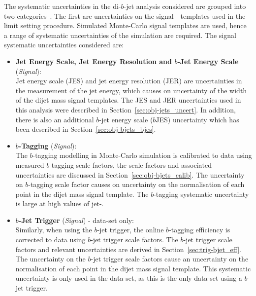 The systematic uncertainties in the di-$b$-jet analysis considered are grouped into two categories~\cite{dibjet-ichep_conf}.
The first are
uncertainties on the signal~\mjj~templates used in the limit setting procedure.
Simulated Monte-Carlo signal templates are used,
hence a range of systematic uncertainties of the simulation are required.
The signal systematic uncertainties considered are:
\begin{itemize}[leftmargin=*]
\item\textbf{Jet Energy Scale, Jet Energy Resolution  and $b$-Jet Energy Scale} \hspace{1mm} (\textit{Signal}):\\
  Jet energy scale (JES) and jet energy resolution (JER) are uncertainties in the measurement of the jet energy,
  which causes on uncertainty of the width of the dijet mass signal templates.
  The JES and JER uncertainties used in this analysis were described in Section~\ref{sec:obj-jets_uncert}.
  In addition, there is also an additional $b$-jet energy scale ($b$JES) uncertainty which
  has been described in Section~\ref{sec:obj-bjets_bjes}.
  \vspace{0.5em}
\item\textbf{$b$-Tagging} \hspace{1mm} (\textit{Signal}):\\
  The $b$-tagging modelling in Monte-Carlo simulation is calibrated to data using measured $b$-tagging scale factors,
  the scale factors and associated uncertainties are discussed in Section~\ref{sec:obj-bjets_calib}.
  The uncertainty on $b$-tagging scale factor causes on uncertainty on the normalisation of each point in the dijet mass signal template.
  The $b$-tagging systematic uncertainty is large at high values of jet-\pT.%
  \vspace{0.5em}
\item\textbf{$b$-Jet Trigger} \hspace{1mm} (\textit{Signal}) - \lm{} data-set only:\\
  Similarly, when using the $b$-jet trigger,
  the online $b$-tagging efficiency is corrected to data using $b$-jet trigger scale factors.
  The $b$-jet trigger scale factors and relevant uncertainties are derived in Section~\ref{sec:trig-bjet_eff}.
  The uncertainty on the $b$-jet trigger scale factors cause an uncertainty on the normalisation of each point in the dijet mass signal template.
  This systematic uncertainty is only used in the \lm{} data-set, as this is the only data-set using a $b$-jet trigger.

\end{itemize}
